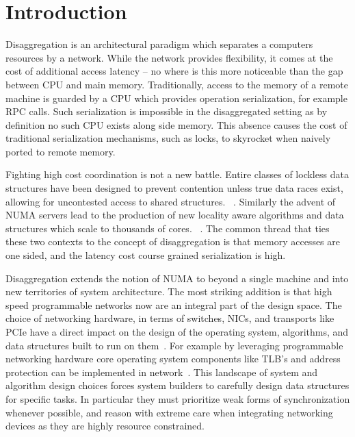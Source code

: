 \section{Introduction}
Disaggregation is an architectural paradigm which separates a computers
resources by a network. While the network provides flexibility, it comes at the
cost of additional access latency
-- no where is this more noticeable than the gap between CPU and main memory.
Traditionally, access to the memory of a remote machine is guarded by a CPU
which provides operation serialization, for example RPC calls.  Such
serialization is impossible in the disaggregated setting as by definition no
such CPU exists along side memory. This absence causes the cost of traditional
serialization mechanisms, such as locks, to skyrocket when naively ported to
remote memory.

Fighting high cost coordination is not a new battle. Entire classes of lockless
data structures have been designed to prevent contention unless true data races
exist, allowing for uncontested access to shared structures.
~\cite{simple-fast,lock-free-skip,non-block-binary,read-concur-btree,lock-free-btree}.
Similarly the advent of NUMA servers lead to the production of new locality
aware algorithms and data structures which scale to thousands of cores.
~\cite{linux-scale,black-box-numa}. The common thread
that ties these two contexts to the concept of disaggregation is that memory
accesses are one sided, and the latency cost course grained serialization is
high.

Disaggregation extends the notion of NUMA to beyond a single machine and into
new territories of system architecture. The most striking addition is that high
speed programmable networks now are an integral part of the design space. The
choice of networking hardware, in terms of switches, NICs, and transports like
PCIe have a direct impact on the design of the operating system, algorithms, and
data structures built to run on
them~\cite{dredbox,firebox,machine,legoos,supernic}. For example by leveraging
programmable networking hardware core operating system components like TLB's and
address protection can be implemented in network~\cite{mind}.  This landscape of
system and algorithm design choices forces system builders to carefully design
data structures for specific tasks.  In particular they must prioritize weak
forms of synchronization whenever possible, and reason with extreme care when
integrating networking devices as they are highly resource constrained.

